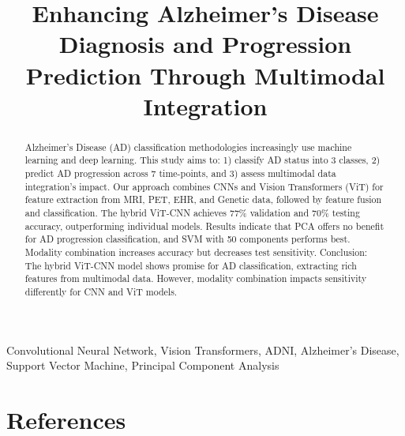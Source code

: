 \documentclass[journal,twoside,web]{ieeecolor}
\begin{document}
\title{Enhancing Alzheimer's Disease Diagnosis and Progression Prediction Through Multimodal Integration}


\maketitle

\begin{abstract}
Alzheimer’s Disease (AD) classification methodologies increasingly use machine learning and deep learning. This study aims to: 1) classify AD status into 3 classes, 2) predict AD progression across 7 time-points, and 3) assess multimodal data integration's impact. Our approach combines CNNs and Vision Transformers (ViT) for feature extraction from MRI, PET, EHR, and Genetic data, followed by feature fusion and classification. The hybrid ViT-CNN achieves 77\% validation and 70\% testing accuracy, outperforming individual models. Results indicate that PCA offers no benefit for AD progression classification, and SVM with 50 components performs best. Modality combination increases accuracy but decreases test sensitivity. Conclusion: The hybrid ViT-CNN model shows promise for AD classification, extracting rich features from multimodal data. However, modality combination impacts sensitivity differently for CNN and ViT models.
\end{abstract}

\begin{IEEEkeywords}
Convolutional Neural Network, Vision Transformers, ADNI, Alzheimer's Disease, Support Vector Machine, Principal Component Analysis\\
\end{IEEEkeywords}


\vspace{-3mm}

% 


\vspace{-3mm}


\vspace{-3mm}


\vspace{-3mm}


\vspace{-3mm}

\section{References}


\end{document}

